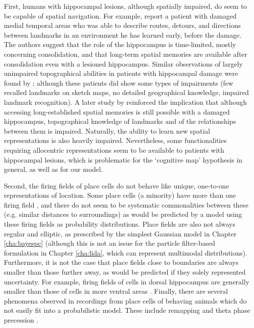 First, humans with hippocampal lesions, although spatially impaired, do seem to be capable of spatial navigation. For example, \citep{teng1999} report a patient with damaged medial temporal areas who was able to describe routes, detours, and directions between landmarks in an environment he has learned early, before the damage. The authors suggest that the role of the hippocampus is time-limited, mostly concerning consolidation, and that long-term spatial memories are available after consolidation even with a lesioned hippocampus. Similar observations of largely unimpaired topographical abilities in patients with hippocampal damage were found by \citep{rosenbaum2000, rosenbaum2005}; although these patients did show some types of impairments (few recalled landmarks on sketch maps, no detailed geographical knowledge, impaired landmark recognition). A later study by \cite{maguire2006} reinforced the implication that although accessing long-established spatial memories is still possible with a damaged hippocampus, topographical knowledge of landmarks and of the relationships between them is impaired. Naturally, the ability to learn new spatial representations is also heavily impaired. Nevertheless, some functionalities requiring allocentric representations seem to be available to patients with hippocampal lesions, which is problematic for the `cognitive map' hypothesis in general, as well as for our model.

Second, the firing fields of place cells do not behave like unique, one-to-one representations of location. Some place cells (a minority) have more than one firing field \citep{burke2011influence}, and there do not seem to be systematic commonalities between these (e.g. similar distances to surroundings) as would be predicted by a model using these firing fields as probability distributions. Place fields are also not always regular and elliptic, as prescribed by the simplest Gaussian model in Chapter \ref{cha:bayespc} (although this is not an issue for the particle filter-based formulation in Chapter \ref{cha:lida}, which can represent multimodal distributions). Furthermore, it is not the case that place fields close to boundaries are always smaller than those further away, as would be predicted if they solely represented uncertainty. For example, firing fields of cells in dorsal hippocampus are generally smaller than those of cells in more ventral areas \citep{kjelstrup2008finite}. Finally, there are several phenomena observed in recordings from place cells of behaving animals which do not easily fit into a probabilistic model. These include remapping \citep{colgin2008understanding} and theta phase precession \citep{skaggs1996theta}.

